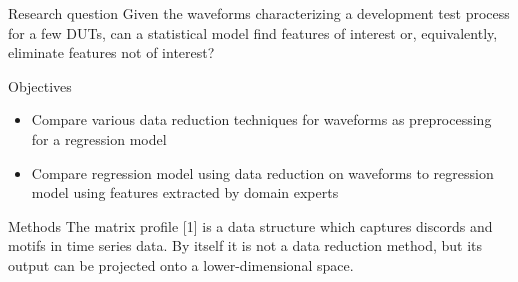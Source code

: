 \documentclass[aspectratio=169]{beamer}
\begin{document}
\begin{frame}[t,fragile]
\begin{columns}[T]
    \vspace{-1cm}

    \begin{column}{0.5\textwidth}
      \begin{center}
        \begin{alertblock}{\centering Research question}
          \setlength{\leftmargini}{1.5em}
          Given the waveforms characterizing a development test process for a few DUTs, can a statistical
          model find features of interest or, equivalently, eliminate features not of interest?
        \end{alertblock}
      \end{center}
      \vspace{-1.2cm}
      \begin{center}
        \begin{alertblock}{\centering Objectives}
          \setlength{\leftmargini}{1.5em}
          \begin{itemize}
            \item Compare various data reduction techniques for waveforms as preprocessing for a regression model
            \item Compare regression model using data reduction on waveforms to regression model using features extracted by domain experts
          \end{itemize}
        \end{alertblock}
      \end{center}
      \vspace{-0.58cm}
      \begin{center}
        \begin{alertblock}{\centering Methods}
          The \textcolor{myOrange}{matrix profile} [1] is a data structure which captures discords and motifs in time series data. By itself it is not a data reduction method, but its output can be projected onto a lower-dimensional space.
        \end{alertblock}
      \end{center}
    \end{column}


\end{columns}
\end{frame}
\end{document}

